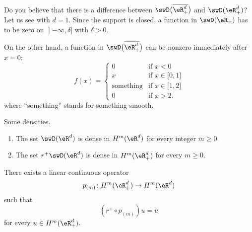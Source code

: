 \begin{normaltext}
	Do you believe that there is a difference between \( \swD\big( \overline{ \eR^d_+ }\big)\) and \( \swD(\eR^d_+)\)? Let us see with \( d=1\). Since the support is closed, a function in \( \swD(\eR_+)\) has to be zero on \( \mathopen] -\infty , \delta \mathclose]\) with \( \delta>0\).

	On the other hand, a function in \( \swD\big( \overline{ \eR^d_+ } \big)\) can be nonzero immediately after \( x=0\):
	\begin{equation}
		f(x)=\begin{cases}
			0                & \text{if } x<0                               \\
			x                & \text{if  } x\in\mathopen[ 0 , 1 \mathclose] \\
			\text{something} & \text{if } x\in \mathopen[ 1 , 2 \mathclose] \\
			0                & \text{if } x>2.
		\end{cases}
	\end{equation}
	where ``something'' stands for something smooth.
\end{normaltext}

\begin{proposition}      \label{PROPooCXYRooPTgSLX}
	Some densities.
	\begin{enumerate}
		\item
		      The set \( \swD(\eR^d)\) is dense in \( H^m(\eR^d)\) for every integer \( m\geq 0\).
		\item
		      The set \( r^+\swD(\eR^d)\) is dense in \( H^m(\eR^d_+)\) for every \( m\geq 0\).
	\end{enumerate}
\end{proposition}

\begin{theorem}
	There exists a linear continuous operator
	\begin{equation}
		p_{(m)}\colon H^m(\eR^d_+)\to H^m(\eR^d)
	\end{equation}
	such that
	\begin{equation}
		(r^+\circ p_{(m)})u=u
	\end{equation}
	for every \( u\in H^m(\eR^d_+)\).
\end{theorem}

